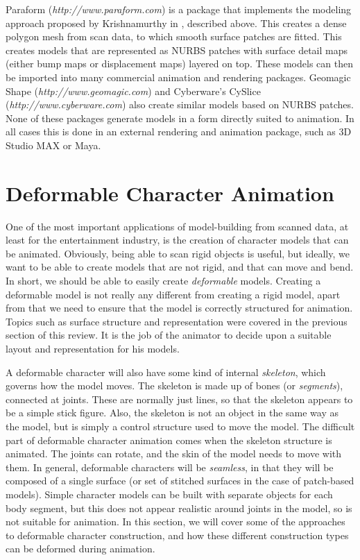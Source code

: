 \documentclass[10pt,oneside,fleqn,a4paper]{book}
\begin{document}
Paraform ({\it http://www.paraform.com}) is a package that implements the modeling approach proposed by Krishnamurthy in \cite{Krishnamurthy96}, described above. This creates a dense polygon mesh from scan data, to which smooth surface patches are fitted. This creates models that are represented as NURBS patches with surface detail maps (either bump maps or displacement maps) layered on top. These models can then be imported into many commercial animation and rendering packages. Geomagic Shape ({\it http://www.geomagic.com}) and Cyberware's CySlice ({\it http://www.cyberware.com}) also create similar models based on NURBS patches. None of these packages generate models in a form directly suited to animation. In all cases this is done in an external rendering and animation package, such as 3D Studio MAX or Maya.

\section{\label{sec:reviewcharacter}Deformable Character Animation}
One of the most important applications of model-building from scanned data, at least for the entertainment industry, is the creation of character models that can be animated. Obviously, being able to scan rigid objects is useful, but ideally, we want to be able to create models that are not rigid, and that can move and bend. In short, we should be able to easily create {\it deformable} models. Creating a deformable model is not really any different from creating a rigid model, apart from that we need to ensure that the model is correctly structured for animation. Topics such as surface structure and representation were covered in the previous section of this review. It is the job of the animator to decide upon a suitable layout and representation for his models. 

A deformable character will also have some kind of internal {\it skeleton}, which governs how the model moves. The skeleton is made up of bones (or {\it segments}), connected at joints. These are normally just lines, so that the skeleton appears to be a simple stick figure. Also, the skeleton is not an object in the same way as the model, but is simply a control structure used to move the model. The difficult part of deformable character animation comes when the skeleton structure is animated. The joints can rotate, and the skin of the model needs to move with them. In general, deformable characters will be {\it seamless}, in that they will be composed of a single surface (or set of stitched surfaces in the case of patch-based models). Simple character models can be built with separate objects for each body segment, but this does not appear realistic around joints in the model, so is not suitable for animation. In this section, we will cover some of the approaches to deformable character construction, and how these different construction types can be deformed during animation.
\end{document}

